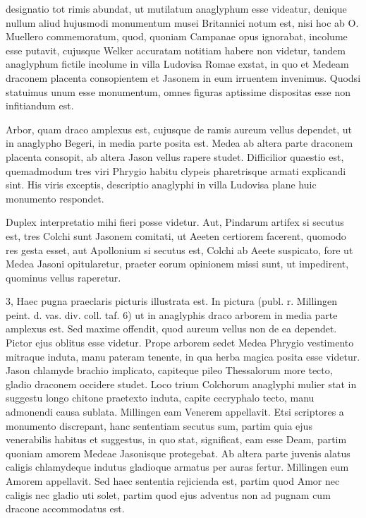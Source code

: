 \documentclass[landscape, a4paper, 11pt, oneside, polutonikogreek, german]{article}
\begin{document}
designatio tot rimis abundat, ut mutilatum anaglyphum esse videatur, denique nullum aliud hujusmodi monumentum musei Britannici notum est, nisi hoc ab O. Muellero commemoratum, quod, quoniam Campanae opus ignorabat, incolume esse putavit, cujusque Welker accuratam notitiam habere non videtur, tandem anaglyphum fictile incolume in villa Ludovisa Romae exstat, in quo et Medeam draconem placenta consopientem et Jasonem in eum irruentem invenimus. Quodsi statuimus unum esse monumentum, omnes figuras aptissime dispositas esse non infitiandum est.

Arbor, quam draco amplexus est, cujusque de ramis aureum vellus dependet, ut in anaglypho Begeri, in media parte posita est. Medea ab altera parte draconem placenta consopit, ab altera Jason vellus rapere studet. Difficilior quaestio est, quemadmodum tres viri Phrygio habitu clypeis pharetrisque armati explicandi sint. His viris exceptis, descriptio anaglyphi in villa Ludovisa plane huic monumento respondet.

Duplex interpretatio mihi fieri posse videtur. Aut, Pindarum artifex si secutus est, tres Colchi sunt Jasonem comitati, ut Aeeten certiorem facerent, quomodo res gesta esset, aut Apollonium si secutus est, Colchi ab Aeete suspicato, fore ut Medea Jasoni opitularetur, praeter eorum opinionem missi sunt, ut impedirent, quominus vellus raperetur.

3, Haec pugna praeclaris picturis illustrata est. In pictura (publ. r. Millingen peint. d. vas. div. coll. taf. 6) ut in anaglyphis draco arborem in media parte amplexus est. Sed maxime offendit, quod aureum vellus non de ea dependet. Pictor ejus oblitus esse videtur. Prope arborem sedet Medea Phrygio vestimento mitraque induta, manu pateram tenente, in qua herba magica posita esse videtur. Jason chlamyde brachio implicato, capiteque pileo Thessalorum more tecto, gladio draconem occidere studet. Loco trium Colchorum anaglyphi mulier stat in suggestu longo chitone praetexto induta, capite cecryphalo tecto, manu admonendi causa sublata. Millingen eam Venerem appellavit. Etsi scriptores a monumento discrepant, hanc sententiam secutus sum, partim quia ejus venerabilis habitus et suggestus, in quo stat, significat, eam esse Deam, partim quoniam amorem Medeae Jasonisque protegebat. Ab altera parte juvenis alatus caligis chlamydeque indutus gladioque armatus per auras fertur. Millingen eum Amorem appellavit. Sed haec sententia rejicienda est, partim quod Amor nec caligis nec gladio uti solet, partim quod ejus adventus non ad pugnam cum dracone accommodatus est.
\end{document}
